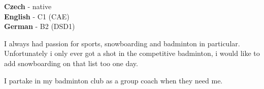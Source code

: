 \documentclass[9pt]{developercv} %
\begin{document}

\begin{minipage}[t]{0.3\textwidth}
	\vspace{-\baselineskip} %

	
	\textbf{Czech} - native\\
	\textbf{English} - C1 (CAE)\\
	\textbf{German} - B2 (DSD1)
\end{minipage}
\hfill
\begin{minipage}[t]{0.3\textwidth}
	\vspace{-\baselineskip} %
	
	
	I always had passion for sports, snowboarding and badminton in particular. Unfortunately i only ever got a shot in the competitive badminton, i would like to add snowboarding on that list too one day.
\end{minipage}
\hfill
\begin{minipage}[t]{0.3\textwidth}
	\vspace{-\baselineskip} %
	
	
	I partake in my badminton club as a group coach when they need me.
\end{minipage}

\end{document}
